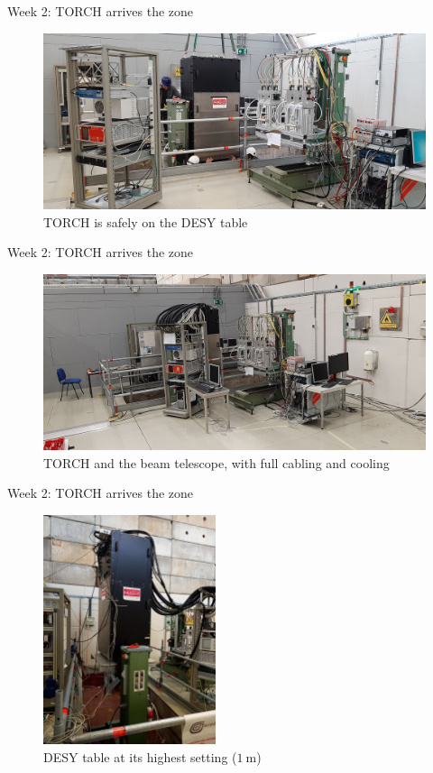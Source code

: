 \documentclass{beamer}
\begin{document}
\begin{frame}{Week 2: TORCH arrives the zone}
  \begin{figure}
    \centering
    \includegraphics[width = 1.0\textwidth]{Plots/TORCH_transport_3.jpg}
    \caption{TORCH is safely on the DESY table}
  \end{figure}
\end{frame}

\begin{frame}{Week 2: TORCH arrives the zone}
  \begin{figure}
    \centering
    \includegraphics[width = 1.0\textwidth]{Plots/TelescopeTORCHoverview.jpg}
    \caption{TORCH and the beam telescope, with full cabling and cooling}
  \end{figure}
\end{frame}

\begin{frame}{Week 2: TORCH arrives the zone}
  \begin{figure}
    \centering
    \includegraphics[width = 0.45\textwidth]{Plots/DESY_table.jpg}
    \caption{DESY table at its highest setting ($\SI{1}{\meter}$)}
  \end{figure}
\end{frame}
\end{document}
